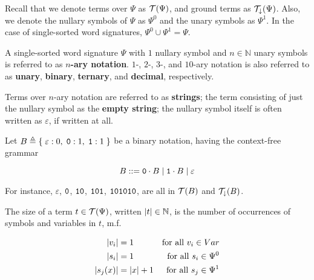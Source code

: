 Recall that we denote terms over $\Psi$ as $\mathcal{T}{\mathopen{}\left({\Psi}\right)\mathclose{}}$, and ground
terms as $\mathcal{T}_\downarrow{\ensuremath{\mathopen{}\left({\Psi}\right)\mathclose{}}}$. Also, we denote the nullary symbols
of $\Psi$ as $\Psi^0$ and the unary symbols as $\Psi^1$. In the case of
single-sorted word signatures, $\Psi^0 \cup \Psi^1 = \Psi$.

\begin{definition} A single-sorted word signature $\Psi$ with $1$ nullary
symbol and $n \in \mathbb{N}$ unary symbols is referred to as \textbf{$n$-ary
notation}. $1$-, $2$-, $3$-, and $10$-ary notation is also referred to as
\textbf{unary}, \textbf{binary}, \textbf{ternary}, and \textbf{decimal},
respectively.  \end{definition}

\begin{definition} Terms over $n$-ary notation are referred to as
\textbf{strings}; the term consisting of just the nullary symbol as the
\textbf{empty string}; the nullary symbol itself is often written as
$\varepsilon$, if written at all. \end{definition} 

\begin{example} Let $B \triangleq \mathopen{}\left\{\mathrel{}{\varepsilon : 0, \; \mathtt{0} : 1, \;
\mathtt{1} : 1}\mathrel{}\right\}\mathclose{}$ be a binary notation, having the context-free grammar

$$B ::= \mathtt{0} \cdot B \mid \mathtt{1} \cdot B \mid \varepsilon$$

For instance, $\varepsilon$, $\mathtt{0}$, $\mathtt{1}\mathtt{0}$,
$\mathtt{1}\mathtt{0}\mathtt{1}$, $\mathtt{1}\mathtt{0}\mathtt{1}\mathtt{0}\mathtt{1}\mathtt{0}$,
are all in $\mathcal{T}{\mathopen{}\left({B}\right)\mathclose{}}$ and $\mathcal{T}_\downarrow{\ensuremath{\mathopen{}\left({B}\right)\mathclose{}}}$.

\end{example}

\begin{definition} \label{def:single-sort-word-term-size} The size of a term $t
\in \mathcal{T}{\mathopen{}\left({\Psi}\right)\mathclose{}}$, written ${\mathopen{}\left|{t}\right|\mathclose{}} \in \mathbb{N}$, is the number of
occurrences of symbols and variables in $t$, m.f.

\begin{align*}
{\ensuremath{\mathopen{}\left|{v_i}\right|\mathclose{}}} &= 1 & \text{for all $v_i \in Var$} \\
{\mathopen{}\left|{s_i}\right|\mathclose{}} &= 1 & \text{for all $s_i\in \Psi^0$} \\
{\mathopen{}\left|{s_j{\mathopen{}\left({x}\right)\mathclose{}}}\right|\mathclose{}} &= {\mathopen{}\left|{x}\right|\mathclose{}} + 1 & \text{for all $s_j \in \Psi^1$}
\end{align*}

\end{definition}

